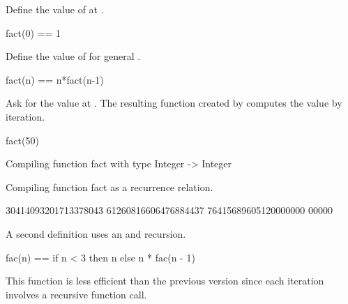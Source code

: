 {{{{{{{{\begin{xtc}
\begin{xtccomment}
Define the value of  at .
\end{xtccomment}
\begin{spadsrc}
fact(0) == 1 
\end{spadsrc}
\end{xtc}
\begin{xtc}
\begin{xtccomment}
Define the value of  for general .
\end{xtccomment}
\begin{spadsrc}
fact(n) == n*fact(n-1)
\end{spadsrc}
\end{xtc}
\begin{xtc}
\begin{xtccomment}
Ask for the value at .
The resulting function created by \Language{}
computes the value by iteration.
\end{xtccomment}
\begin{spadsrc}
fact(50) 
\end{spadsrc}
\begin{MessageOutput}
   Compiling function fact with type Integer -> Integer 
\end{MessageOutput}
\begin{MessageOutput}
   Compiling function fact as a recurrence relation.
\end{MessageOutput}
\begin{TeXOutput}
\begin{fricasmath}{3}
30414093201713378043 61260816606476884437 76415689605120000000 00000%
\end{fricasmath}
\end{TeXOutput}
\end{xtc}
\begin{xtc}
\begin{xtccomment}
A second definition uses an  and recursion.
\end{xtccomment}
\begin{spadsrc}
fac(n) == if n < 3 then n else n * fac(n - 1) 
\end{spadsrc}
\end{xtc}
\begin{xtc}
\begin{xtccomment}
This function is less efficient than the previous version since
each iteration involves a recursive function call.

\end{xtccomment}
\end{xtc}}}}}}}}}
